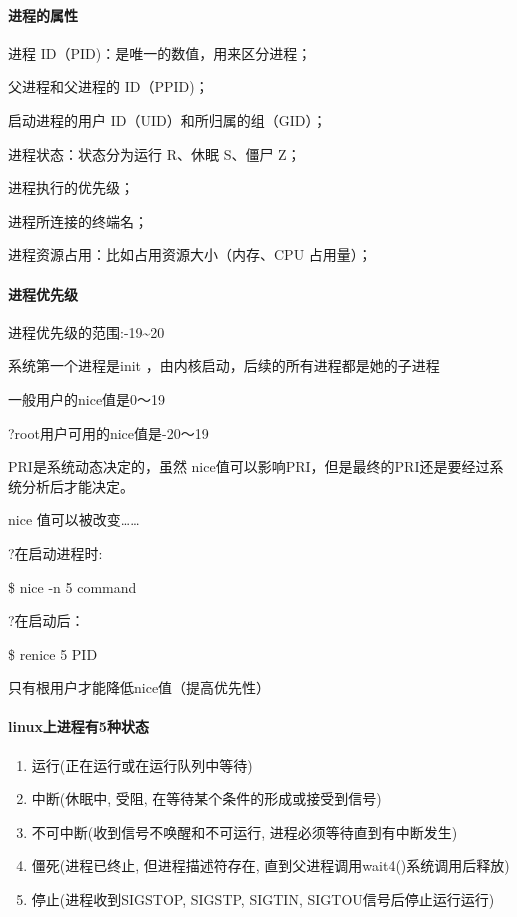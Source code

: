 \documentclass[letterpaper,10pt]{sphinxmanual}
\begin{document}
\paragraph{进程的属性}
\label{Linux_pro_mana/process:id6}
进程 ID（PID)：是唯一的数值，用来区分进程；

父进程和父进程的 ID（PPID)；

启动进程的用户 ID（UID）和所归属的组（GID）；

进程状态：状态分为运行 R、休眠 S、僵尸 Z；

进程执行的优先级；

进程所连接的终端名；

进程资源占用：比如占用资源大小（内存、CPU 占用量）；


\paragraph{进程优先级}
\label{Linux_pro_mana/process:id7}
进程优先级的范围:-19\textasciitilde{}20

系统第一个进程是init ，由内核启动，后续的所有进程都是她的子进程

一般用户的nice值是0～19

?root用户可用的nice值是-20～19

PRI是系统动态决定的，虽然 nice值可以影响PRI，但是最终的PRI还是要经过系统分析后才能决定。

nice 值可以被改变……

?在启动进程时:

\$ nice -n 5 command

?在启动后：

\$ renice 5 PID

只有根用户才能降低nice值（提高优先性）


\paragraph{linux上进程有5种状态}
\label{Linux_pro_mana/process:linux5}\begin{enumerate}
\item {} 
运行(正在运行或在运行队列中等待)

\item {} 
中断(休眠中, 受阻, 在等待某个条件的形成或接受到信号)

\item {} 
不可中断(收到信号不唤醒和不可运行, 进程必须等待直到有中断发生)

\item {} 
僵死(进程已终止, 但进程描述符存在, 直到父进程调用wait4()系统调用后释放)

\item {} 
停止(进程收到SIGSTOP, SIGSTP, SIGTIN, SIGTOU信号后停止运行运行)

\end{enumerate}
\end{document}
